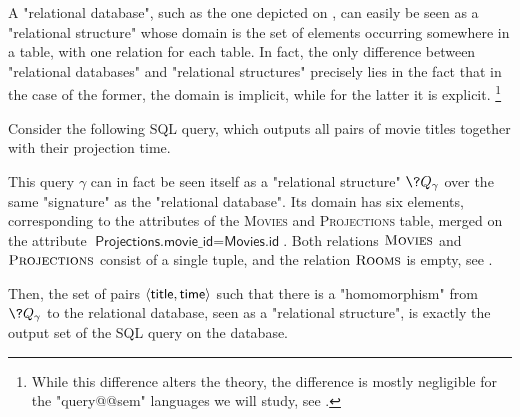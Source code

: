 \begin{example}
	\AP\label{ex:sql-as-hom}
	A "relational database", such as the one depicted on
	, can easily be seen as a "relational structure"
	whose domain is the set of elements occurring somewhere in a table,
	with one relation for each table.
	In fact, the only difference between "relational databases" and "relational structures"
	precisely lies in the fact that in the case of the former, the domain is implicit,
	while for the latter it is explicit.%
	\footnote{While this difference alters the theory, the difference is mostly negligible
	for the "query@@sem" languages we will study, see .}

	Consider the following SQL query, which outputs all pairs
	of movie titles together with their projection time.
	

	This query $\gamma$ can in fact be seen itself as a "relational structure" $\?Q_\gamma$	over
	the same "signature" as the "relational database".
	Its domain has six elements, corresponding to the attributes of
	the \textsc{Movies} and \textsc{Projections} table, merged on the attribute
	$\textsf{Projections.movie\_id} = \textsf{Movies.id}$.
	Both relations $\textsc{Movies}$ and $\textsc{Projections}$ consist of a single tuple,
	and the relation $\textsc{Rooms}$ is empty, see .

	Then, the set of pairs $\langle\textsf{title}, \textsf{time}\rangle$
	such that there is a "homomorphism" from $\?Q_\gamma$ to the relational database, seen as
	a "relational structure", is exactly the output set of the SQL query on the database.
\end{example}

